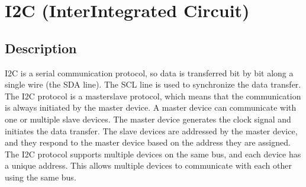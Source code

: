\documentclass[letterpaper,10pt,english]{sphinxmanual}
\begin{document}
\begin{sphinxVerbatim}[commandchars=\\\{\}]

 


     
                 
\end{sphinxVerbatim}

\sphinxstepscope


\chapter{I2C (Inter\sphinxhyphen{}Integrated Circuit)}
\label{\detokenize{i2c:i2c-inter-integrated-circuit}}\label{\detokenize{i2c::doc}}

\section{Description}
\label{\detokenize{i2c:description}}
\sphinxAtStartPar
I2C is a serial communication protocol, so data is transferred bit by bit along a single wire (the SDA line). The SCL line is used to synchronize the data transfer. The I2C protocol is a master\sphinxhyphen{}slave protocol, which means that the communication is always initiated by the master device. A master device can communicate with one or multiple slave devices. The master device generates the clock signal and initiates the data transfer. The slave devices are addressed by the master device, and they respond to the master device based on the address they are assigned. The I2C protocol supports multiple devices on the same bus, and each device has a unique address. This allows multiple devices to communicate with each other using the same bus.
\end{document}
